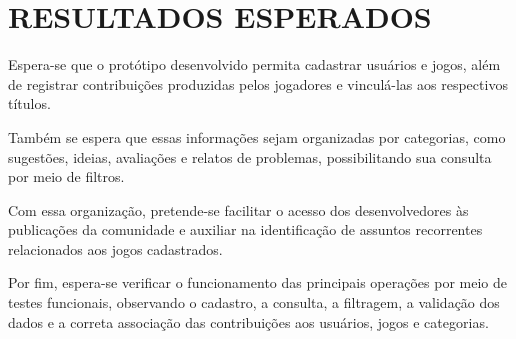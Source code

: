 

\chapter{RESULTADOS ESPERADOS}

Espera-se que o protótipo desenvolvido permita cadastrar usuários e jogos, além de registrar contribuições produzidas pelos jogadores e vinculá-las aos respectivos títulos.

Também se espera que essas informações sejam organizadas por categorias, como sugestões, ideias, avaliações e relatos de problemas, possibilitando sua consulta por meio de filtros.

Com essa organização, pretende-se facilitar o acesso dos desenvolvedores às publicações da comunidade e auxiliar na identificação de assuntos recorrentes relacionados aos jogos cadastrados.

Por fim, espera-se verificar o funcionamento das principais operações por meio de testes funcionais, observando o cadastro, a consulta, a filtragem, a validação dos dados e a correta associação das contribuições aos usuários, jogos e categorias.
